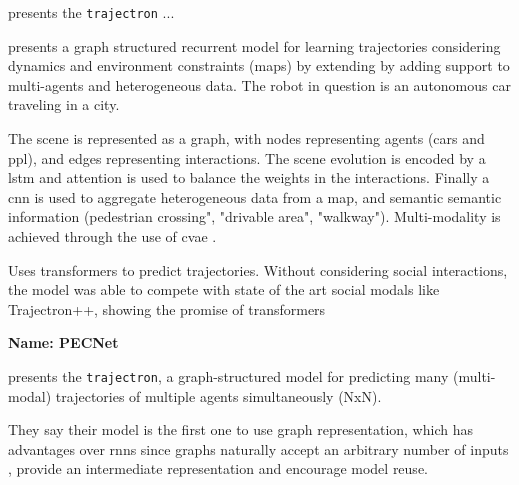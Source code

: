 
\cite{ivanovic2019trajectron} presents the \texttt{trajectron} ...


\cite{salzmann2020trajectron++}  presents a graph structured recurrent model for learning trajectories considering dynamics and environment constraints (maps) by extending \cite{ivanovic2019trajectron} by adding support to multi-agents and heterogeneous data. The robot in question is an autonomous car traveling in a city.

The scene is represented as a graph, with nodes representing agents (cars and ppl), and edges representing interactions.
%
The scene evolution is encoded by a \gls{lstm} and attention is used to balance the weights in the interactions.
%
Finally a \gls{cnn} is used to aggregate heterogeneous data from a map, and semantic semantic information (pedestrian crossing", "drivable area", "walkway"). 
%
Multi-modality is achieved through the use of \gls{cvae} .


\cite{giuliari2020transformer} Uses transformers to predict trajectories. Without considering social interactions, the model was able to compete with state of the art social modals like Trajectron++, showing the promise of transformers


\textbf{Name: PECNet}



\cite{ivanovic2019trajectron} presents the \texttt{trajectron}, a graph-structured model for predicting many (multi-modal) trajectories of multiple agents simultaneously (NxN).

They say their model is the first one to use graph representation, which has advantages over \glspl{rnn} since graphs naturally accept an arbitrary number of inputs , provide an intermediate representation and encourage model reuse.

